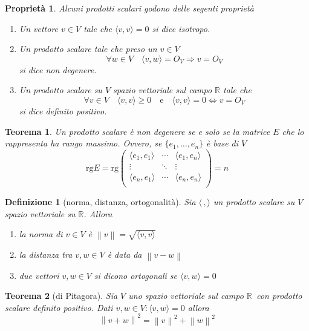 \documentclass[9pt, a4paper]{article}
\newcommand{\R}{\mathbb{R}}
\newcommand{\letvsR}{Sia $ V $ uno spazio vettoriale sul campo $ \R $}
\newcommand{\scprd}[2]{\langle #1, #2 \rangle}
\newcommand{\norm}[1]{\left\lVert#1\right\rVert}
\theoremstyle{mythm}
\newtheorem{definition}{Definizione}[section]
\newtheorem{propriety}{Proprietà}[section]
\newtheorem{thm}{Teorema}[section]
\begin{document}
\begin{propriety} Alcuni prodotti scalari godono delle segenti proprietà
	\begin{enumerate}
		\item Un vettore $ v \in V $ tale che $ \scprd{v}{v} = 0 $ si dice \emph{isotropo}.
		\item Un prodotto scalare tale che preso un $ v \in V $ \[\forall w \in V \quad \scprd{v}{w} = O_V \Rightarrow v = O_V\] si dice \emph{non degenere}.
		\item Un prodotto scalare su $ V $ spazio vettoriale sul campo $ \R $ tale che \[ \forall v \in V \quad \scprd{v}{v} \geq 0 \quad \mathrm{e} \quad \scprd{v}{v} = 0 \Leftrightarrow v = O_V \] si dice \emph{definito positivo}.
	\end{enumerate}
\end{propriety}

\begin{thm}
	Un prodotto scalare è non degenere se e solo se la matrice $ E $ che lo rappresenta ha rango massimo. Ovvero, se $ \{e_1, \ldots, e_n \} $ è base di $ V $
	\[ \mathrm{rg} E = \mathrm{rg} 
	\begin{pmatrix}
		\scprd{e_1}{e_1} & \cdots  & \scprd{e_1}{e_n} \\
		\vdots           & \ddots & \vdots \\
		\scprd{e_n}{e_1} & \cdots  & \scprd{e_n}{e_n} \\
	\end{pmatrix}
	= n	\]
\end{thm}

\begin{definition}[norma, distanza, ortogonalità]
	Sia $ \scprd{\,}{} $ un prodotto scalare su $ V $ spazio vettoriale su $ \R $. Allora
	\begin{enumerate}
		\item la norma di $ v \in V $ è $ \norm{v} = \sqrt{\scprd{v}{v}} $
		\item la distanza tra $ v, w \in V $ è data da $ \norm{v - w} $
		\item due vettori $ v, w \in V $ si dicono ortogonali se $ \scprd{v}{w} = 0 $
	\end{enumerate}
\end{definition}

\begin{thm}[di Pitagora]
	\letvsR \, con prodotto scalare definito positivo. Dati $ v, w \in V \colon \scprd{v}{w} = 0 $	allora \[\norm{v + w}^2 = \norm{v}^2 + \norm{w}^2\]
\end{thm}
\end{document}
